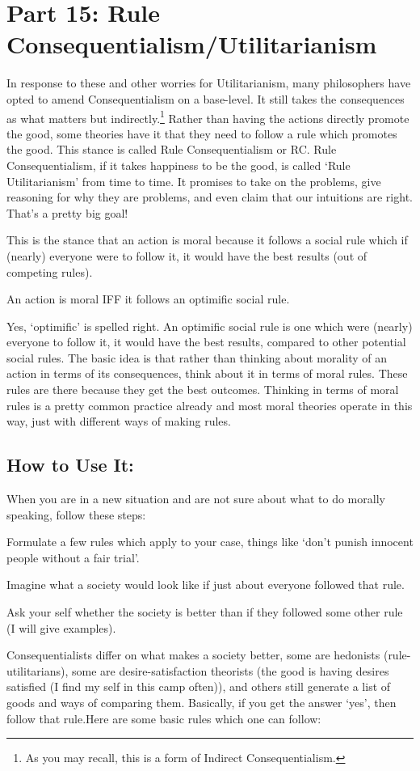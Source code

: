 \chapter{Part 15: Rule Consequentialism/Utilitarianism}
In response to these and other worries for Utilitarianism, many philosophers have opted to amend Consequentialism on a base-level. It still takes the consequences as what matters but indirectly.\footnote{As you may recall, this is a form of Indirect Consequentialism.} Rather than having the actions directly promote the good, some theories have it that they need to follow a rule which promotes the good. This stance is called Rule Consequentialism or RC. Rule Consequentialism, if it takes happiness to be the good, is called ‘Rule Utilitarianism’ from time to time. It promises to take on the problems, give reasoning for why they are problems, and even claim that our intuitions are right. That’s a pretty big goal!

This is the stance that an action is moral because it follows a social rule which if (nearly) everyone were to follow it, it would have the best results (out of competing rules).
\begin{center}
An action is moral IFF it follows an optimific social rule.
\end{center}
Yes, ‘optimific’ is spelled right. An optimific social rule is one which were (nearly) everyone to follow it, it would have the best results, compared to other potential social rules. The basic idea is that rather than thinking about morality of an action in terms of its consequences, think about it in terms of moral rules. These rules are there because they get the best outcomes. Thinking in terms of moral rules is a pretty common practice already and most moral theories operate in this way, just with different ways of making rules.

\section{How to Use It:}
When you are in a new situation and are not sure about what to do morally speaking, follow these steps:
\begin{earg}
    \item[1] Formulate a few rules which apply to your case, things like ‘don’t punish innocent people without a fair trial’.
    \item[2] Imagine what a society would look like if just about everyone followed that rule.
    \item[3] Ask your self whether the society is better than if they followed some other rule (I will give examples).
\end{earg}
Consequentialists differ on what makes a society better, some are hedonists (rule-utilitarians), some are desire-satisfaction theorists (the good is having desires satisfied (I find my self in this camp often)), and others still generate a list of goods and ways of comparing them. Basically, if you get the answer ‘yes’, then follow that rule.Here are some basic rules which one can follow: 

